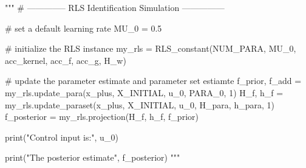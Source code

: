 """
# -------------- RLS Identification Simulation ---------------

# set a default learning rate
MU_0 = 0.5

# initialize the RLS instance
my_rls = RLS_constant(NUM_PARA, MU_0, acc_kernel, acc_f, acc_g, H_w)

# update the parameter estimate and parameter set estiamte
f_prior, f_add = my_rls.update_para(x_plus, X_INITIAL, u_0, PARA_0, 1)
H_f, h_f = my_rls.update_paraset(x_plus, X_INITIAL, u_0, H_para, h_para, 1)
f_posterior = my_rls.projection(H_f, h_f, f_prior)

print("Control input is:", u_0)

print("The posterior estimate", f_posterior)
"""